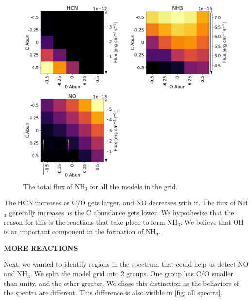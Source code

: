 \documentclass[oneside, single, authoryear, semicolon]{lion-msc}
\newcommand{\4}{$_4$}
\newcommand{\3}{$_3$}
\newcommand{\2}{$_2$}
\begin{document}
\begin{figure}[!ht]
    \centering
    \includegraphics[width=\linewidth]{Figures/Heatmaps2.pdf}
    \caption{The total flux of NH\3 for all the models in the grid.}
    \label{fig: flux NH3}
\end{figure}

The HCN increases as C/O gets larger, and NO decreases with it. The flux of NH\3 generally increases as the C abundance gets lower. We hypothesize that the reason for this is the reactions that take place to form NH\3.
We believe that OH is an important component in the formation of NH\3.


\textbf{MORE REACTIONS}

Next, we wanted to identify regions in the spectrum that could help us detect NO and NH\3. We split the model grid into 2 groups. One group has C/O smaller than unity, and the other greater. We chose this distinction as the behaviors of the spectra are different. This difference is also visible in \autoref{fig: all spectra}. 

\end{document}
